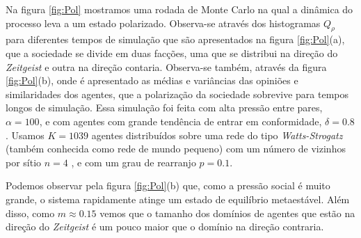 Na figura \ref{fig:Pol} mostramos uma rodada de Monte Carlo na qual a
dinâmica do processo leva a um estado polarizado. Observa-se através
dos histogramas $Q_\rho$ para diferentes tempos de simulação que são
apresentados na figura \ref{fig:Pol}(a), que a sociedade se divide em duas
facções, uma que se distribui na direção do \textit{Zeitgeist} e outra na
direção contaria. Observa-se também,  através da figura \ref{fig:Pol}(b),
onde é apresentado as médias e variâncias das opiniões e similaridades dos
agentes, que a polarização da sociedade sobrevive para tempos longos de
simulação. Essa simulação foi feita com alta pressão entre pares, $\alpha
= 100$, e com agentes com grande tendência de entrar em conformidade,
$\delta = 0.8$. Usamos $K = 1039$ agentes distribuídos sobre uma rede do
tipo \textit{Watts-Strogatz} (também conhecida como rede de mundo pequeno)
com um número de vizinhos por sítio $n = 4$ , e com um grau de rearranjo
$p = 0.1$. 

Podemos observar pela figura \ref{fig:Pol}(b) que, como a pressão social
é muito grande, o sistema rapidamente atinge um estado de equilíbrio
metaestável. Além disso, como $m\approx0.15$ vemos que o tamanho dos
domínios de agentes que estão na direção do \textit{Zeitgeist} é um
pouco maior que o domínio na direção contraria.

